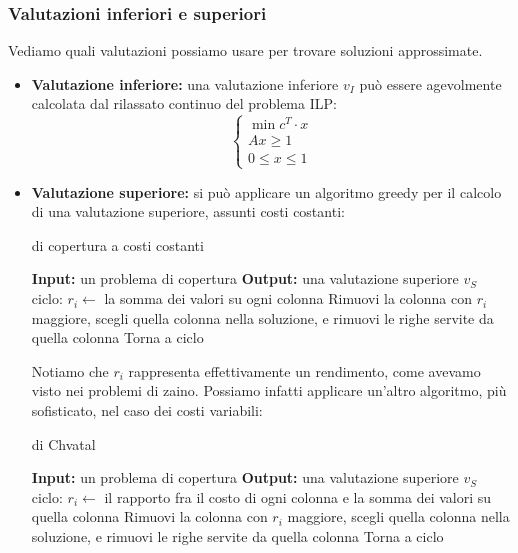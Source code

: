 \documentclass[a4paper,11pt]{article}
\begin{document}
\subsubsection{Valutazioni inferiori e superiori}
Vediamo quali valutazioni possiamo usare per trovare soluzioni approssimate. 
\begin{itemize}
	\item \textbf{Valutazione inferiore:} una valutazione inferiore $v_I$ può essere agevolmente calcolata dal rilassato continuo del problema ILP:
		\[
			\begin{cases}
				\min c^T \cdot x \\ 
				Ax \geq 1 \\ 
				0 \leq x \leq 1
			\end{cases}
		\]
	\item \textbf{Valutazione superiore:} si può applicare un algoritmo greedy per il calcolo di una valutazione superiore, assunti costi costanti:
\begin{algorithm}[H]
\caption{di copertura a costi costanti}
\begin{algorithmic}
	\STATE \textbf{Input:} un problema di copertura %
	\STATE \textbf{Output:} una valutazione superiore $v_S$ %
	\STATE \textsf{ciclo:}
	\STATE $r_i \leftarrow$ la somma dei valori su ogni colonna
	\STATE Rimuovi la colonna con $r_i$ maggiore, scegli quella colonna nella soluzione, e rimuovi le righe servite da quella colonna
	\STATE Torna a \textsf{ciclo}
\end{algorithmic}
\end{algorithm}
Notiamo che $r_i$ rappresenta effettivamente un rendimento, come avevamo visto nei problemi di zaino.
Possiamo infatti applicare un'altro algoritmo, più sofisticato, nel caso dei costi variabili:
	\begin{algorithm}[H]
\caption{di Chvatal}
\begin{algorithmic}
	\STATE \textbf{Input:} un problema di copertura %
	\STATE \textbf{Output:} una valutazione superiore $v_S$%
	\STATE \textsf{ciclo:}
	\STATE $r_i \leftarrow$ il rapporto fra il costo di ogni colonna e la somma dei valori su quella colonna
	\STATE Rimuovi la colonna con $r_i$ maggiore, scegli quella colonna nella soluzione, e rimuovi le righe servite da quella colonna
	\STATE Torna a \textsf{ciclo}
\end{algorithmic}
\end{algorithm}
\end{itemize}
\end{document}
